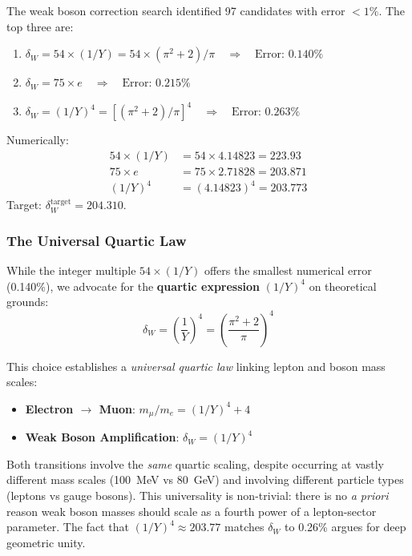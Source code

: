 \documentclass[11pt,a4paper]{article}
\begin{document}
The weak boson correction search identified 97 candidates with error $<1\%$. The top three are:
\begin{enumerate}
\item $\delta_W = 54 \times (1/Y) = 54 \times (\pi^2+2)/\pi \quad \Rightarrow \quad \text{Error: } 0.140\%$
\item $\delta_W = 75 \times e \quad \Rightarrow \quad \text{Error: } 0.215\%$
\item $\delta_W = (1/Y)^4 = [(\pi^2+2)/\pi]^4 \quad \Rightarrow \quad \text{Error: } 0.263\%$
\end{enumerate}

Numerically:
\begin{align}
54 \times (1/Y) &= 54 \times 4.14823 = 223.93 \\
75 \times e &= 75 \times 2.71828 = 203.871 \\
(1/Y)^4 &= (4.14823)^4 = 203.773
\end{align}
Target: $\delta_W^{\text{target}} = 204.310$.

\subsubsection{The Universal Quartic Law}

While the integer multiple $54 \times (1/Y)$ offers the smallest numerical error (0.140\%), we advocate for the \textbf{quartic expression} $(1/Y)^4$ on theoretical grounds:
\begin{equation}
\delta_W = \left(\frac{1}{Y}\right)^4 = \left( \frac{\pi^2 + 2}{\pi} \right)^4
\label{eq:delta_w_quartic}
\end{equation}

This choice establishes a \emph{universal quartic law} linking lepton and boson mass scales:
\begin{itemize}
\item \textbf{Electron $\to$ Muon}: $m_\mu / m_e = (1/Y)^4 + 4$
\item \textbf{Weak Boson Amplification}: $\delta_W = (1/Y)^4$
\end{itemize}

Both transitions involve the \emph{same} quartic scaling, despite occurring at vastly different mass scales (100~MeV vs 80~GeV) and involving different particle types (leptons vs gauge bosons). This universality is non-trivial: there is no \emph{a priori} reason weak boson masses should scale as a fourth power of a lepton-sector parameter. The fact that $(1/Y)^4 \approx 203.77$ matches $\delta_W$ to 0.26\% argues for deep geometric unity.
\end{document}
